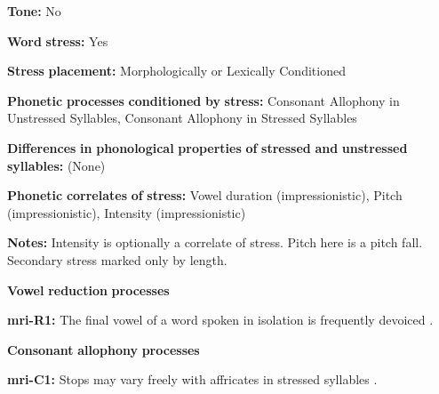 \documentclass[output=paper]{langsci/langscibook}
\begin{document}
\begin{styleBody}
\textbf{Tone:} No
\end{styleBody}

\begin{styleBody}
\textbf{Word} \textbf{stress:} Yes
\end{styleBody}

\begin{styleBody}
\textbf{Stress} \textbf{placement:} Morphologically or Lexically Conditioned
\end{styleBody}

\begin{styleBody}
\textbf{Phonetic} \textbf{processes} \textbf{conditioned} \textbf{by} \textbf{stress:} Consonant Allophony in Unstressed Syllables, Consonant Allophony in Stressed Syllables
\end{styleBody}

\begin{styleBody}
\textbf{Differences} \textbf{in} \textbf{phonological} \textbf{properties} \textbf{of} \textbf{stressed} \textbf{and} \textbf{unstressed} \textbf{syllables:} (None)
\end{styleBody}

\begin{styleBody}
\textbf{Phonetic} \textbf{correlates} \textbf{of} \textbf{stress:} Vowel duration (impressionistic), Pitch (impressionistic), Intensity (impressionistic)
\end{styleBody}

\begin{styleBody}
\textbf{Notes:} Intensity is optionally a correlate of stress. Pitch here is a pitch fall. Secondary stress marked only by length.
\end{styleBody}

\begin{styleBody}
\textbf{Vowel} \textbf{reduction} \textbf{processes}
\end{styleBody}

\begin{styleBody}
\textbf{mri-R1:} The final vowel of a word spoken in isolation is frequently devoiced \citep[546]{Bauer1999}.
\end{styleBody}

\begin{styleBody}
\textbf{Consonant} \textbf{allophony} \textbf{processes}
\end{styleBody}

\begin{styleBody}
\textbf{mri-C1:} Stops may vary freely with affricates in stressed syllables \citep[545]{Bauer1999}.
\end{styleBody}
\end{document}
